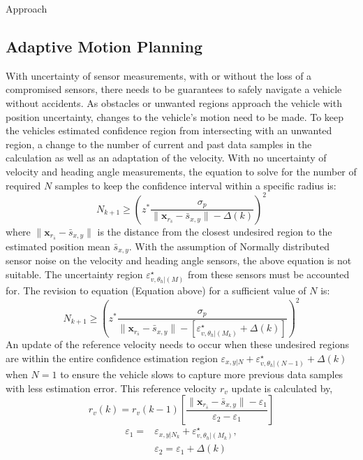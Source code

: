 \begin{section}{Approach}
\subsection{Adaptive Motion Planning}
With uncertainty of sensor measurements, with or without the loss of a compromised sensors, there needs to be guarantees to safely navigate a vehicle without accidents. As obstacles or unwanted regions approach the vehicle with position uncertainty, changes to the vehicle's motion need to be made. To keep the vehicles estimated confidence region from intersecting with an unwanted region, a change to the number of current and past data samples in the calculation as well as an adaptation of the velocity. With no uncertainty of velocity and heading angle measurements, the equation to solve for the number of required $N$ samples to keep the confidence interval within a specific radius is:
    \begin{equation}
	    N_{k+1} \geq \left(z^{*} \frac{ \sigma_p }{ {\lVert \bm{x}_{r_{\bar{s}}} - \bar{s}_{x,y} \rVert} -\Delta(k) } \right)^2
	\end{equation}
where $\lVert {\bm{x}_{r_{\bar{s}}}-\bar{s}_{x,y}} \rVert$ is the distance from the closest undesired region to the estimated position mean $\bar{s}_{x,y}$.
With the assumption of Normally distributed sensor noise on the velocity and heading angle sensors, the above equation is not suitable. The uncertainty region $\varepsilon_{v,\theta_h|(M)}^{\star}$ from these sensors must be accounted for. The revision to equation (Equation above) for a sufficient value of $N$ is:
    \begin{equation}
	    N_{k+1} \geq \left(z^{*} \frac{ \sigma_p }{ {\lVert \bm{x}_{r_{\bar{s}}} - \bar{s}_{x,y} \rVert} -[\varepsilon_{v,\theta_h|(M_k)}^{\star}+\Delta(k)] } \right)^2
	\end{equation}
An update of the reference velocity needs to occur when these undesired regions are within the entire confidence estimation region $ \varepsilon_{x,y|N} +\varepsilon_{v,\theta_h|(N-1)}^{\star}+\Delta(k)$ when $N=1$ to ensure the vehicle slows to capture more previous data samples with less estimation error. This reference velocity $r_v$ update is calculated by,
    \begin{equation}
	    r_v(k)=r_v(k-1) \left[ \frac{\lVert \bm{x}_{r_{\bar{s}}} - \bar{s}_{x,y} \rVert - \varepsilon_1}{\varepsilon_2 - \varepsilon_1} \right]
	\end{equation}
	\begin{equation}
	\begin{split}
	    \varepsilon_1=&\varepsilon_{x,y|N_k} +\varepsilon_{v,\theta_h|(M_k)}^{\star},\\ &\varepsilon_2=\varepsilon_1+\Delta(k) \nonumber	    
	\end{split}
	\end{equation}



\end{section}
